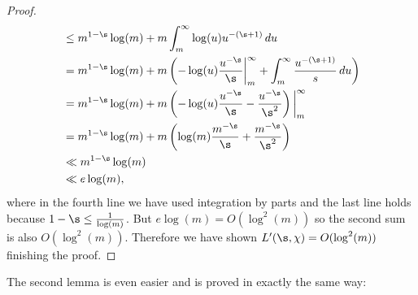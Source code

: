 \begin{proof}
\begin{align*}
        &\le m^{1-\s}\log(m)+m\int_{m}^{\infty}\log(u)u^{-(\s+1)}\,du \\
        &= m^{1-\s}\log(m)+m\left(-\log(u)\frac{u^{-\s}}{\s}\bigg|_{m}^{\infty}+\int_{m}^{\infty}\frac{u^{-(\s+1)}}{s}\,du\right) \\
        &= m^{1-\s}\log(m)+m\left(-\log(u)\frac{u^{-\s}}{\s}-\frac{u^{-\s}}{\s^{2}}\right)\bigg|_{m}^{\infty} \\
        &= m^{1-\s}\log(m)+m\left(\log(m)\frac{m^{-\s}}{\s}+\frac{m^{-\s}}{\s^{2}}\right) \\
        &\ll m^{1-\s}\log(m) \\
        &\ll e\log(m),
      \end{align*}
      where in the fourth line we have used integration by parts and the last line holds because $1-\s \le \frac{1}{\log(m)}$. But $e\log(m) = O(\log^{2}(m))$ so the second sum is also $O(\log^{2}(m))$. Therefore we have shown $L'(\s,\chi) = O(\log^{2}(m))$ finishing the proof. 
    \end{proof}

    The second lemma is even easier and is proved in exactly the same way:

